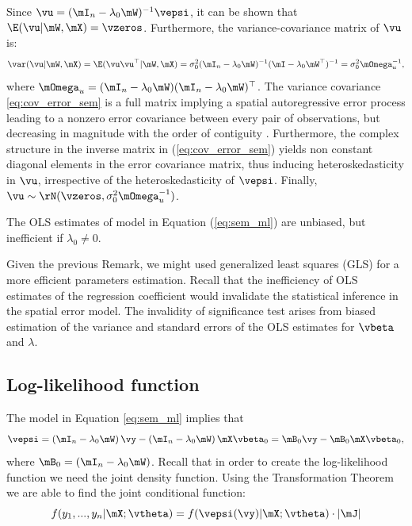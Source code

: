 \documentclass[english,12pt]{book}\usepackage[]{graphicx}\usepackage[]{xcolor}
\begin{document}
Since $\vu = (\mI_n - \lambda_0\mW)^{-1}\vepsi$, it can be shown that $\E(\vu| \mW, \mX) = \vzeros$. Furthermore, the variance-covariance matrix of $\vu$ is: 
\begin{equation}\label{eq:cov_error_sem}
\var(\vu| \mW, \mX)=\E(\vu\vu^\top| \mW, \mX) = \sigma^2_0(\mI_n-\lambda_0\mW)^{-1}(\mI-\lambda_0\mW^\top)^{-1}=\sigma^2_0\mOmega_{u}^{-1},
\end{equation}
%
where $\mOmega_{u}=(\mI_n-\lambda_0\mW)(\mI_n-\lambda_0\mW)^\top$. The variance covariance \eqref{eq:cov_error_sem} is a full matrix implying a spatial autoregressive error process leading to a nonzero error covariance between every pair of observations, but decreasing in magnitude with the order of contiguity \citep{AnselinBera1998}. Furthermore, the complex structure in the inverse matrix in (\ref{eq:cov_error_sem}) yields non constant diagonal elements in the error covariance matrix, thus inducing heteroskedasticity in $\vu$, irrespective of the heteroskedasticity of $\vepsi$. Finally, $\vu \sim \rN(\vzeros, \sigma^2_0\mOmega_u^{-1})$.

\begin{remark}\label{remark:ols_sem}
  The OLS estimates of model in Equation (\ref{eq:sem_ml}) are unbiased, but inefficient if $\lambda_0 \neq 0$.
\end{remark}

Given the previous Remark, we might used generalized least squares (GLS) for a more efficient parameters estimation. Recall that the inefficiency of OLS estimates of the regression coefficient would invalidate the statistical inference in the spatial error model. The invalidity of significance test arises from biased estimation of the variance and standard errors of the OLS estimates for $\vbeta$ and $\lambda$.

\subsection{Log-likelihood function}

The model in Equation \eqref{eq:sem_ml} implies that
\begin{equation*}
\vepsi = \left(\mI_n-\lambda_0\mW\right)\vy - \left(\mI_n-\lambda_0\mW\right)\mX\vbeta_0 = \mB_0\vy - \mB_0\mX\vbeta_0,
\end{equation*}
%
where $\mB_0 = (\mI_n-\lambda_0\mW)$. Recall that in order to create the log-likelihood function we need the joint density function. Using the Transformation Theorem we are able to find the joint conditional function:
\begin{equation*}
  f(y_1,...,y_n|\mX; \vtheta) = f(\vepsi(\vy)| \mX ; \vtheta) \cdot \left|\mJ\right|
\end{equation*}
\end{document}
